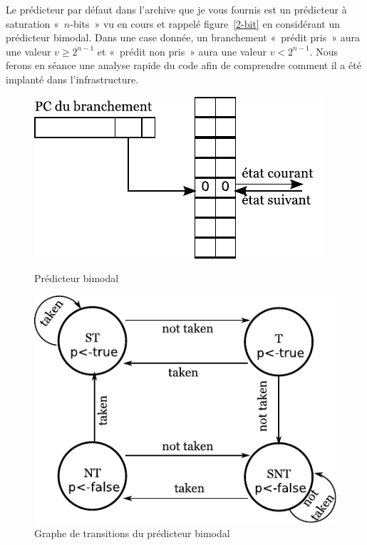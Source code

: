 \documentclass[a4paper]{article}
\begin{document}
Le prédicteur par défaut dans l'archive que je vous fournis est un prédicteur à saturation «~$n$-bits~» vu en cours et rappelé figure~\ref{2-bit} en considérant un prédicteur bimodal.
Dans une case donnée, un branchement «~prédit pris~» aura une valeur $v\geq 2^{n-1}$ et «~prédit non pris~» aura une valeur $v<2^{n-1}$.
Nous ferons en séance une analyse rapide du code afin de comprendre comment il a été implanté dans l'infrastructure.

\begin{figure}[htb]
   \begin{minipage}[t]{.44\linewidth}\vspace{0pt}
      \center\includegraphics[scale=1]{2-bits}
      \caption{Prédicteur bimodal}
      \label{2-bit}
   \end{minipage}%
\hfill
   \begin{minipage}[t]{.54\linewidth}\vspace{0pt}
      \center\includegraphics[scale=.65]{2bg1}
      \caption{\label{2bg1}Graphe de transitions du prédicteur bimodal}
   \end{minipage}
\end{figure}
\end{document}

